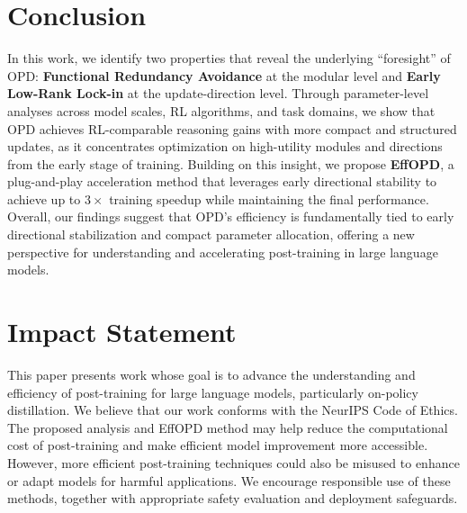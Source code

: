\documentclass{article}
\begin{document}
\section{Conclusion}
In this work, we identify two properties that reveal the underlying ``foresight'' of OPD: \textbf{Functional Redundancy Avoidance} at the modular level and \textbf{Early Low-Rank Lock-in} at the update-direction level. Through parameter-level analyses across model scales, RL algorithms, and task domains, we show that OPD achieves RL-comparable reasoning gains with more compact and structured updates, as it concentrates optimization on high-utility modules and directions from the early stage of training. Building on this insight, we propose \textbf{EffOPD}, a plug-and-play acceleration method that leverages early directional stability to achieve up to \(3\times\) training speedup while maintaining the final performance. Overall, our findings suggest that OPD's efficiency is fundamentally tied to early directional stabilization and compact parameter allocation, offering a new perspective for understanding and accelerating post-training in large language models.






\appendix

\newpage

\section{Impact Statement}
This paper presents work whose goal is to advance the understanding and efficiency of post-training for large language models, particularly on-policy distillation. We believe that our work conforms with the NeurIPS Code of Ethics. The proposed analysis and EffOPD method may help reduce the computational cost of post-training and make efficient model improvement more accessible. However, more efficient post-training techniques could also be misused to enhance or adapt models for harmful applications. We encourage responsible use of these methods, together with appropriate safety evaluation and deployment safeguards.
\end{document}

